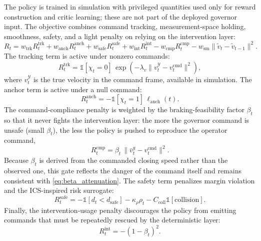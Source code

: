 \documentclass[11pt]{article}
\begin{document}
The policy is trained in simulation with privileged quantities used only for
reward construction and critic learning; these are not part of the deployed
governor input. The objective combines command tracking, measurement-space
holding, smoothness, safety, and a light penalty on relying on the intervention
layer:
\begin{equation}
    R_t
    = w_{\mathrm{trk}} R^{\mathrm{trk}}_t
    + w_{\mathrm{anch}} R^{\mathrm{anch}}_t
    + w_{\mathrm{safe}} R^{\mathrm{safe}}_t
    + w_{\mathrm{int}} R^{\mathrm{int}}_t
    - w_{\mathrm{cmp}} R^{\mathrm{cmp}}_t
    - w_{\mathrm{sm}} \|\tilde v_t-\tilde v_{t-1}\|^2.
    \label{eq:reward_total}
\end{equation}
The tracking term is active under nonzero commands:
\begin{equation}
    R^{\mathrm{trk}}_t
    = \mathbb{1}[\chi_t=0]\,
    \exp\!\left(-\lambda_v \|v^{\mathcal{Y}}_t - v^{\mathrm{cmd}}_t\|^2\right),
    \label{eq:tracking_reward}
\end{equation}
where $v^{\mathcal{Y}}_t$ is the true velocity in the command frame, available
in simulation. The anchor term is active under a null command:
\begin{equation}
    R^{\mathrm{anch}}_t
    = -\mathbb{1}[\chi_t=1]\,\ell_{\mathrm{anch}}(t).
    \label{eq:anchor_reward}
\end{equation}
The command-compliance penalty is weighted by the braking-feasibility factor
$\beta_t$ so that it never fights the intervention layer: the more the governor
command is unsafe (small $\beta_t$), the less the policy is pushed to reproduce
the operator command,
\begin{equation}
    R^{\mathrm{cmp}}_t
    = \beta_t\,\|\bar v^g_t-v^{\mathrm{cmd}}_t\|^2 .
    \label{eq:compliance_reward}
\end{equation}
Because $\beta_t$ is derived from the commanded closing speed rather than the
observed one, this gate reflects the danger of the command itself and remains
consistent with \eqref{eq:beta_attenuation}. The safety term penalizes margin
violation and the ICS-inspired risk surrogate:
\begin{equation}
    R^{\mathrm{safe}}_t
    = -\mathbb{1}[d_t<d_{\mathrm{safe}}]
      -\kappa_{\rho}\rho_t
      -C_{\mathrm{coll}}\mathbb{1}[\mathrm{collision}].
    \label{eq:safety_reward}
\end{equation}
Finally, the intervention-usage penalty discourages the policy from emitting
commands that must be repeatedly rescued by the deterministic layer:
\begin{equation}
    R^{\mathrm{int}}_t = -(1-\beta_t)^2 .
    \label{eq:intervention_reward}
\end{equation}
\end{document}
